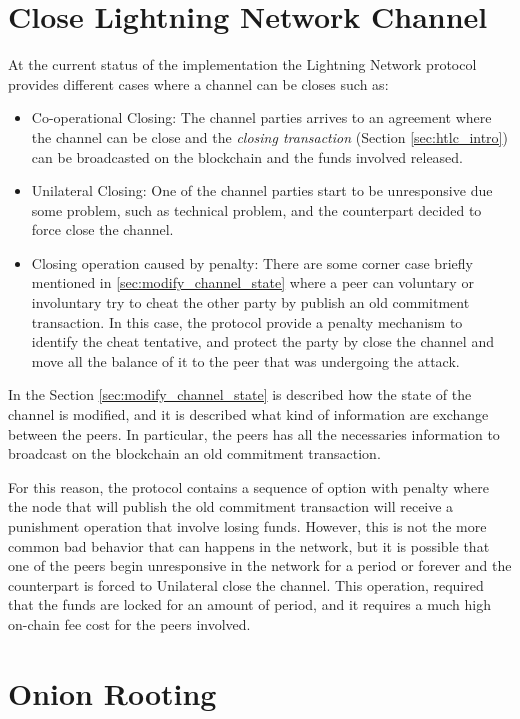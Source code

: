 \section{Close Lightning Network Channel}
\label{sec:close_operation}

At the current status of the implementation the Lightning Network protocol provides different cases where a channel can be closes such as:

\begin{itemize}
  \item Co-operational Closing: The channel parties arrives to an agreement where the channel can be close and the
        \emph{closing transaction} (Section \ref{sec:htlc_intro}) can be broadcasted on the blockchain and the funds involved released.
  \item Unilateral Closing: One of the channel parties start to be unresponsive due some problem, such as technical problem, and the counterpart
        decided to force close the channel.
  \item Closing operation caused by penalty: There are some corner case briefly mentioned in \ref{sec:modify_channel_state} where a peer can voluntary or involuntary try to cheat the other party by publish an old commitment transaction. In this case, the protocol provide a penalty mechanism to identify the cheat tentative, and protect the party by close the channel and move all the balance of it to the peer that was undergoing the attack.
\end{itemize}

In the Section \ref{sec:modify_channel_state} is described how the state of the channel is modified, and it is described what kind of information are
exchange between the peers. In particular, the peers has all the necessaries information to broadcast on the blockchain an old commitment transaction.

For this reason, the protocol contains a sequence of option with penalty where the node that will publish the old commitment transaction
will receive a punishment operation that involve losing funds. However, this is not the more common bad behavior that can happens in
the network, but it is possible that one of the peers begin unresponsive in the network for a period or forever
and the counterpart is forced to Unilateral close the channel. This operation,
required that the funds are locked for an amount of period, and it requires a much high on-chain fee cost for the peers involved.

\section{Onion Rooting}
\label{sec:onion_routing}

